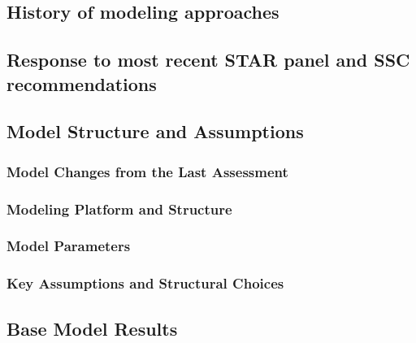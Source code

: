 \documentclass[
]{scrartcl}
\begin{document}
\hypertarget{history-of-modeling-approaches}{%
\subsection{History of modeling
approaches}\label{history-of-modeling-approaches}}

\hypertarget{response-to-most-recent-star-panel-and-ssc-recommendations}{%
\subsection{Response to most recent STAR panel and SSC
recommendations}\label{response-to-most-recent-star-panel-and-ssc-recommendations}}

\hypertarget{model-structure-and-assumptions}{%
\subsection{Model Structure and
Assumptions}\label{model-structure-and-assumptions}}

\hypertarget{model-changes-from-the-last-assessment}{%
\subsubsection{Model Changes from the Last
Assessment}\label{model-changes-from-the-last-assessment}}

\hypertarget{modeling-platform-and-structure}{%
\subsubsection{Modeling Platform and
Structure}\label{modeling-platform-and-structure}}

\hypertarget{model-parameters}{%
\subsubsection{Model Parameters}\label{model-parameters}}

\hypertarget{key-assumptions-and-structural-choices}{%
\subsubsection{Key Assumptions and Structural
Choices}\label{key-assumptions-and-structural-choices}}

\hypertarget{base-model-results}{%
\subsection{Base Model Results}\label{base-model-results}}
\end{document}
